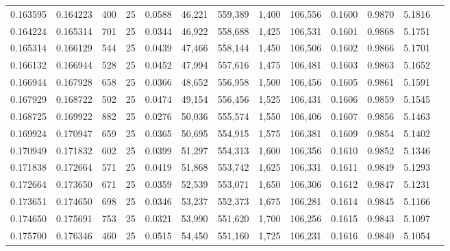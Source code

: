 \begin{tabular}{rrrrrrrrrrrrr}
0.163595 & 0.164223 &   400 &  25 &                                     0.0588 &  46,221 & 559,389 &   1,400 & 106,556 & 0.1600 & 0.9870 & 5.1816 \\
0.164224 & 0.165314 &   701 &  25 &                                     0.0344 &  46,922 & 558,688 &   1,425 & 106,531 & 0.1601 & 0.9868 & 5.1751 \\
0.165314 & 0.166129 &   544 &  25 &                                     0.0439 &  47,466 & 558,144 &   1,450 & 106,506 & 0.1602 & 0.9866 & 5.1701 \\
0.166132 & 0.166944 &   528 &  25 &                                     0.0452 &  47,994 & 557,616 &   1,475 & 106,481 & 0.1603 & 0.9863 & 5.1652 \\
0.166944 & 0.167928 &   658 &  25 &                                     0.0366 &  48,652 & 556,958 &   1,500 & 106,456 & 0.1605 & 0.9861 & 5.1591 \\
0.167929 & 0.168722 &   502 &  25 &                                     0.0474 &  49,154 & 556,456 &   1,525 & 106,431 & 0.1606 & 0.9859 & 5.1545 \\
0.168725 & 0.169922 &   882 &  25 &                                     0.0276 &  50,036 & 555,574 &   1,550 & 106,406 & 0.1607 & 0.9856 & 5.1463 \\
0.169924 & 0.170947 &   659 &  25 &                                     0.0365 &  50,695 & 554,915 &   1,575 & 106,381 & 0.1609 & 0.9854 & 5.1402 \\
0.170949 & 0.171832 &   602 &  25 &                                     0.0399 &  51,297 & 554,313 &   1,600 & 106,356 & 0.1610 & 0.9852 & 5.1346 \\
0.171838 & 0.172664 &   571 &  25 &                                     0.0419 &  51,868 & 553,742 &   1,625 & 106,331 & 0.1611 & 0.9849 & 5.1293 \\
0.172664 & 0.173650 &   671 &  25 &                                     0.0359 &  52,539 & 553,071 &   1,650 & 106,306 & 0.1612 & 0.9847 & 5.1231 \\
0.173651 & 0.174650 &   698 &  25 &                                     0.0346 &  53,237 & 552,373 &   1,675 & 106,281 & 0.1614 & 0.9845 & 5.1166 \\
0.174650 & 0.175691 &   753 &  25 &                                     0.0321 &  53,990 & 551,620 &   1,700 & 106,256 & 0.1615 & 0.9843 & 5.1097 \\
0.175700 & 0.176346 &   460 &  25 &                                     0.0515 &  54,450 & 551,160 &   1,725 & 106,231 & 0.1616 & 0.9840 & 5.1054 \\

\end{tabular}

